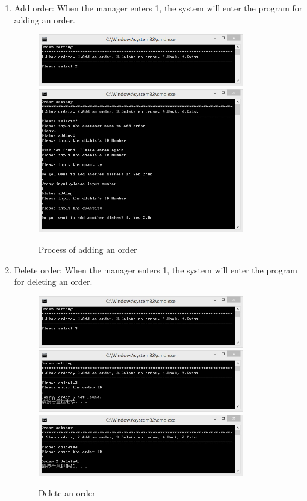 \documentclass{article}
\begin{document}
\begin{enumerate}
    \item Add order:\newline
    When the manager enters 1, the system will enter the program for adding an order. 
        \begin{figure}[H]
        \centering
        \includegraphics[width=0.85\textwidth]{F/F222221.png}
        \includegraphics[width=0.85\textwidth]{F/F2c2.jpg}
        \caption{Process of adding an order}
        \end{figure}
        
    \item Delete order:\newline
    When the manager enters 1, the system will enter the program for deleting an order.
        \begin{figure}[H]
        \centering
        \includegraphics[width=0.85\textwidth]{F/F3a.jpg}
        \includegraphics[width=0.85\textwidth]{F/F3b1.jpg}
        \includegraphics[width=0.85\textwidth]{F/F3b2.jpg}
        \caption{Delete an order}
        \end{figure}
        

\end{enumerate}
\end{document}
